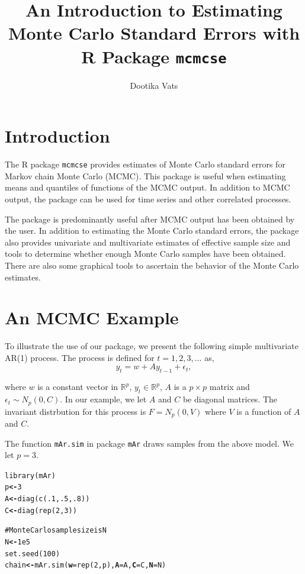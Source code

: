 \documentclass[11pt]{article}\usepackage[]{graphicx}\usepackage[]{color}
\title{An Introduction to Estimating Monte Carlo Standard Errors with R Package \texttt{mcmcse} }
\author{Dootika Vats}
\makeatletter
\newcommand{\hlnum}[1]{\textcolor[rgb]{1,0.078,0.576}{#1}}%
\newcommand{\hlcom}[1]{\textcolor[rgb]{0.161,0.161,0.8}{#1}}%
\newcommand{\hlstd}[1]{\textcolor[rgb]{0,0,0}{#1}}%
\newcommand{\hlkwb}[1]{\textcolor[rgb]{0.18,0.545,0.341}{\textbf{#1}}}%
\newcommand{\hlkwc}[1]{\textcolor[rgb]{0.412,0.412,0.412}{\textbf{#1}}}%
\newcommand{\hlkwd}[1]{\textcolor[rgb]{0,0,0.561}{#1}}%
\newenvironment{kframe}{%
 \def\at@end@of@kframe{}%
 \ifinner\ifhmode%
  \def\at@end@of@kframe{\end{minipage}}%
  \begin{minipage}{\columnwidth}%
 \fi\fi%
 \def\FrameCommand##1{\hskip\@totalleftmargin \hskip-\fboxsep
 \colorbox{shadecolor}{##1}\hskip-\fboxsep
     \hskip-\linewidth \hskip-\@totalleftmargin \hskip\columnwidth}%
 \MakeFramed {\advance\hsize-\width
   \@totalleftmargin\z@ \linewidth\hsize
   \@setminipage}}%
 {\par\unskip\endMakeFramed%
 \at@end@of@kframe}
\newenvironment{knitrout}{}{} %
\makeatother
\begin{document}
\maketitle
\setlength\parindent{0pt}
\tableofcontents

\break
\section{Introduction}
The R package \texttt{mcmcse} provides estimates of Monte Carlo standard errors for Markov chain Monte Carlo (MCMC). This package is useful when estimating means and quantiles of functions of the MCMC output. In addition to MCMC output, the package can be used for time series and other correlated processes. 

The package is predominantly useful after MCMC output has been obtained by the user. In addition to estimating the Monte Carlo standard errors, the package also provides univariate and multivariate estimates of effective sample size and tools to determine whether enough Monte Carlo samples have been obtained. There are also some graphical tools to ascertain the behavior of the Monte Carlo estimates.




\bigskip
\section{An MCMC Example}

To illustrate the use of our package, we present the following simple multivariate AR(1) process. The process is defined for $t = 1, 2, 3, \dots$ as,
\[y_t = w + A y_{t-1} + \epsilon_t, \]

where $w$ is a constant vector in $\mathbb{R}^p$, $y_t \in \mathbb{R}^p$, $A$ is a $p \times p$ matrix and $\epsilon_t \sim N_p(0, C)$. In our example, we let $A$ and $C$ be diagonal matrices. The invariant distrbution for this process is $F = N_p(0, V)$ where $V$ is a function of $A$ and $C$. 

The function \texttt{mAr.sim} in package \texttt{mAr} draws samples from the above model. We let $p = 3$.

\begin{knitrout}
\color{fgcolor}\begin{kframe}
\begin{alltt}
\hlkwd{library}\hlstd{(mAr)}
\hlstd{p} \hlkwb{<-} \hlnum{3}
\hlstd{A} \hlkwb{<-} \hlkwd{diag}\hlstd{(}\hlkwd{c}\hlstd{(}\hlnum{.1}\hlstd{,} \hlnum{.5}\hlstd{,} \hlnum{.8}\hlstd{))}
\hlstd{C} \hlkwb{<-} \hlkwd{diag}\hlstd{(}\hlkwd{rep}\hlstd{(}\hlnum{2}\hlstd{,} \hlnum{3}\hlstd{))}

\hlcom{# Monte Carlo sample size is N}
\hlstd{N} \hlkwb{<-} \hlnum{1e5}
\hlkwd{set.seed}\hlstd{(}\hlnum{100}\hlstd{)}
\hlstd{chain} \hlkwb{<-} \hlkwd{mAr.sim}\hlstd{(}\hlkwc{w} \hlstd{=} \hlkwd{rep}\hlstd{(}\hlnum{2}\hlstd{,p),} \hlkwc{A} \hlstd{= A,} \hlkwc{C} \hlstd{= C,} \hlkwc{N} \hlstd{= N)}
\end{alltt}
\end{kframe}
\end{knitrout}
\end{document}
